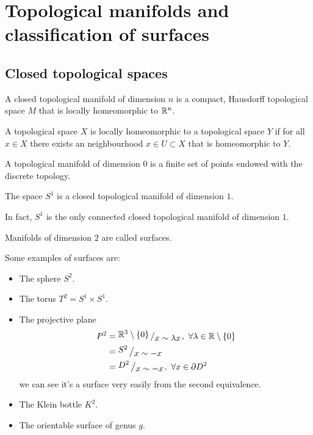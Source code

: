 \documentclass[11pt,a4paper]{article}
\begin{document}
\section{Topological manifolds and classification of surfaces}

\subsection{Closed topological spaces}
\begin{definition}
  A closed topological manifold of dimension $n$ is a compact, Hausdorff
  topological space $M$ that is locally homeomorphic to $\mathbb{R}^n$.
\end{definition}
\begin{remark}
  A topological space $X$ is locally homeomorphic to a topological space
  $Y$ if for all $x \in X$ there exists an neighbourhood $x \in U \subset X$
  that is homeomorphic to $Y$.
\end{remark}

\begin{example}
  A topological manifold of dimension $0$ is a finite set of points endowed
  with the discrete topology.
\end{example}

\begin{example}
  The space $S^1$ is a closed topological manifold of dimension $1$.
\end{example}
\begin{remark}
  In fact, $S^1$ is the only connected closed topological manifold
  of dimension $1$.
\end{remark}

\begin{remark}
  Manifolds of dimension $2$ are called surfaces.
\end{remark}

Some examples of surfaces are:
\begin{itemize}
  \item The sphere $S^2$.
  \item The torus $T^2 = S^1 \times S^1$.
  \item The projective plane
    \begin{align*}
      P^2 &= \bigslant{\R^3 \setminus \set{0}}{x \sim \lambda x},\ 
        \forall \lambda \in \R \setminus \set{0} \\
      &= \bigslant{S^2}{x \sim -x} \\
      &= \bigslant{D^2}{x \sim -x},\ \forall x \in \partial D^2
    \end{align*}
  we can see it's a surface very easily from the second equivalence.
  \item The Klein bottle $K^2$.
  \item The orientable surface of genus $g$.
\end{itemize}
\end{document}
